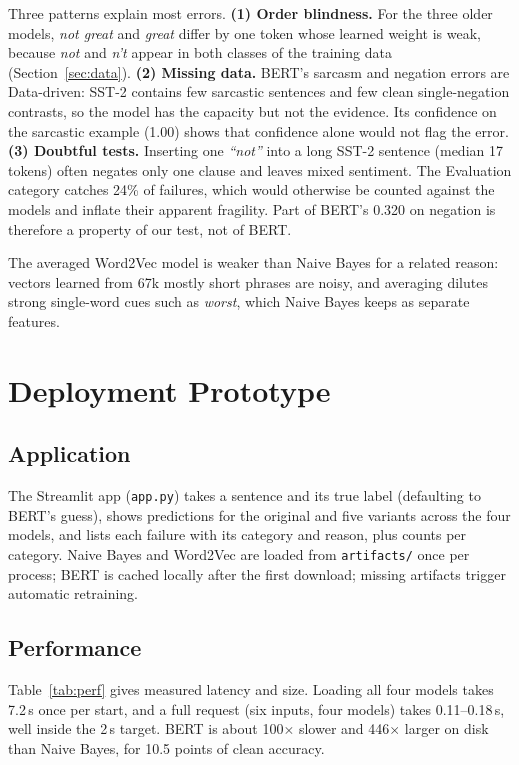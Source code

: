 \documentclass[conference]{IEEEtran}
\newcommand{\ex}[1]{\textit{``#1''}}
\begin{document}
Three patterns explain most errors. \textbf{(1) Order blindness.} For the three older models,
\emph{not great} and \emph{great} differ by one token whose learned weight is weak, because
\emph{not} and \emph{n't} appear in both classes of the training data
(Section~\ref{sec:data}). \textbf{(2) Missing data.} BERT's sarcasm and negation errors are
Data-driven: SST-2 contains few sarcastic sentences and few clean single-negation contrasts, so the
model has the capacity but not the evidence. Its confidence on the sarcastic example (1.00) shows
that confidence alone would not flag the error. \textbf{(3) Doubtful tests.} Inserting one
\ex{not} into a long SST-2 sentence (median 17 tokens) often negates only one clause and leaves
mixed sentiment. The Evaluation category catches 24\% of failures, which would otherwise be
counted against the models and inflate their apparent fragility. Part of BERT's 0.320 on negation
is therefore a property of our test, not of BERT.

The averaged Word2Vec model is weaker than Naive Bayes for a related reason: vectors learned from
67k mostly short phrases are noisy, and averaging dilutes strong single-word cues such as
\emph{worst}, which Naive Bayes keeps as separate features.

\section{Deployment Prototype}\label{sec:deploy}

\subsection{Application}
The Streamlit app (\texttt{app.py}) takes a sentence and its true label (defaulting to BERT's
guess), shows predictions for the original and five variants across the four models, and lists each
failure with its category and reason, plus counts per category. Naive Bayes and Word2Vec are loaded
from \texttt{artifacts/} once per process; BERT is cached locally after the first download; missing
artifacts trigger automatic retraining.

\subsection{Performance}
Table~\ref{tab:perf} gives measured latency and size. Loading all four models takes 7.2\,s once per
start, and a full request (six inputs, four models) takes 0.11--0.18\,s, well inside the 2\,s
target. BERT is about 100$\times$ slower and 446$\times$ larger on disk than Naive Bayes, for 10.5
points of clean accuracy.
\end{document}

